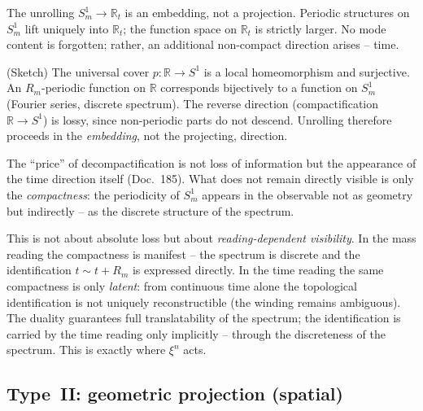 \begin{theorem}\label{satz:typeI}
The unrolling $S^1_m \to \mathbb{R}_t$ is an embedding, not a projection.
Periodic structures on $S^1_m$ lift uniquely into $\mathbb{R}_t$; the function
space on $\mathbb{R}_t$ is strictly larger. No mode content is forgotten;
rather, an additional non-compact direction arises -- time.
\end{theorem}

\begin{beweis}
(Sketch) The universal cover $p:\mathbb{R}\to S^1$ is a local homeomorphism and
surjective. An $R_m$-periodic function on $\mathbb{R}$ corresponds bijectively to
a function on $S^1_m$ (Fourier series, discrete spectrum). The reverse direction
(compactification $\mathbb{R}\to S^1$) is lossy, since non-periodic parts do not
descend. Unrolling therefore proceeds in the \emph{embedding}, not the
projecting, direction.
\end{beweis}

\begin{corollary}
The ``price'' of decompactification is not loss of information but the
appearance of the time direction itself (Doc.~185). What does not remain
directly visible is only the \emph{compactness}: the periodicity of $S^1_m$
appears in the observable not as geometry but indirectly -- as the discrete
structure of the spectrum.
\end{corollary}

\begin{remark}\label{bem:residual}
This is not about absolute loss but about \emph{reading-dependent visibility}.
In the mass reading the compactness is manifest -- the spectrum is discrete and
the identification $t \sim t + R_m$ is expressed directly. In the time reading
the same compactness is only \emph{latent}: from continuous time alone the
topological identification is not uniquely reconstructible (the winding remains
ambiguous). The duality guarantees full translatability of the spectrum; the
identification is carried by the time reading only implicitly -- through the
discreteness of the spectrum. This is exactly where $\xi^n$ acts.
\end{remark}

\subsection{Type~II: geometric projection (spatial)}

